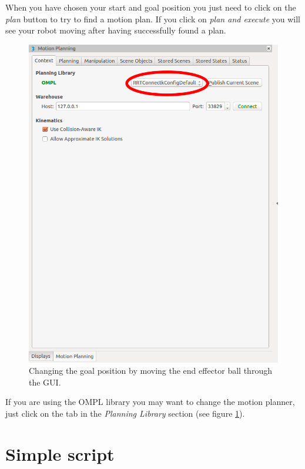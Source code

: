 When you have chosen your start and goal position you just need to click on the \emph{plan} button to try to find a motion plan. If you click on \emph{plan and execute} you will see your robot moving after having successfully found a plan.


\begin{figure}[ht]
\includegraphics[scale=0.19]{images/motion_planning/gui_change_planner.png}
\centering
\caption{Changing the goal position by moving the end effector ball through the GUI.}
\label{fig:gui_change_planner}
\end{figure}

If you are using the OMPL library you may want to change the motion planner, just click on the tab in the \emph{Planning Library} section (see figure \ref{fig:gui_change_planner}).

\section{Simple script}

